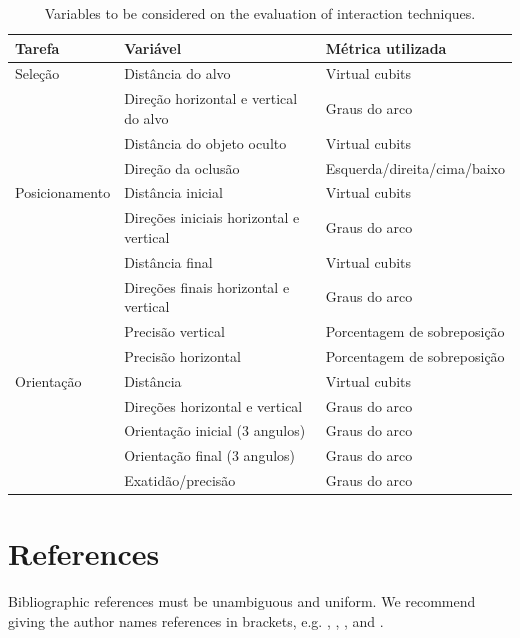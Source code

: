 \documentclass{SBCbookchapter}
\begin{document}
\begin{table}[h!]
	\caption{Variables to be considered on the evaluation of
		interaction techniques.}
	\label{tabone}
	\begin{footnotesize}
	\begin{tabular}{|p{40mm}|p{55mm}|p{42mm}|}
	\hline
	\hspace*{\fill}\textbf{Tarefa}\hspace*{\fill} &
	\hspace*{\fill}\textbf{Variável}\hspace*{\fill} & 
	\hspace*{\fill}\textbf{Métrica utilizada}\hspace*{\fill}\\
	\hline
	Seleção &
	Distância do alvo &
	Virtual cubits \\ \cline{2-3}
	& Direção horizontal e vertical do alvo &
	Graus do arco \\ \cline{2-3}
	& Distância do objeto oculto &
	Virtual cubits \\ \cline{2-3}
	& Direção da oclusão &
	Esquerda/direita/cima/baixo \\
	\hline
	Posicionamento &
	Distância inicial &
	Virtual cubits \\ \cline{2-3}
	& Direções iniciais horizontal e vertical &
	Graus do arco \\ \cline{2-3}
	& Distância final &
	Virtual cubits \\ \cline{2-3}
	& Direções finais horizontal e vertical &
	Graus do arco \\ \cline{2-3}
	& Precisão vertical &
	Porcentagem de sobreposição \\ \cline{2-3}
	& Precisão horizontal &
	Porcentagem de sobreposição \\
	\hline
	Orientação &
	Distância &
	Virtual cubits \\ \cline{2-3}
	& Direções horizontal e vertical &
	Graus do arco \\ \cline{2-3}
	& Orientação inicial (3 angulos) &
	Graus do arco \\ \cline{2-3}
	& Orientação final (3 angulos) &
	Graus do arco \\ \cline{2-3}
	& Exatidão/precisão &
	Graus do arco \\
	\hline
	\end{tabular}
	\end{footnotesize}
\end{table}

\section{References}
Bibliographic references must be unambiguous and uniform.  We
recommend giving the author names references in brackets,
e.g. \cite{knuth1986texbook},
\cite{boulic19913d}, \cite{dyer1995motion}, and \cite{holton1995soft}.



\end{document}

